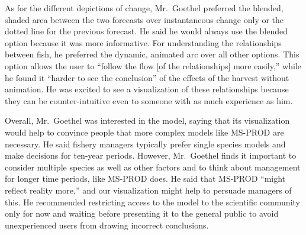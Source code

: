 As for the different depictions of change, Mr.\ Goethel preferred the blended, shaded area between the two forecasts over instantaneous change only or the dotted line for the previous forecast.  He said he would always use the blended option because it was more informative.  For understanding the relationships between fish, he preferred the dynamic, animated arc over all other options.  This option allows the user to ``follow the flow [of the relationships] more easily,'' while he found it ``harder to see the conclusion'' of the effects of the harvest without animation.  He was excited to see a visualization of these relationships because they can be counter-intuitive even to someone with as much experience as him.

Overall, Mr.\ Goethel was interested in the model, saying that its visualization would help to convince people that more complex models like MS-PROD are necessary.  He said fishery managers typically prefer single species models and make decisions for ten-year periods.  However, Mr.\ Goethel finds it important to consider multiple species as well as other factors and to think about management for longer time periods, like MS-PROD does.  He said that MS-PROD ``might reflect reality more,'' and our visualization might help to persuade managers of this.  He recommended restricting access to the model to the scientific community only for now and waiting before presenting it to the general public to avoid unexperienced users from drawing incorrect conclusions.
